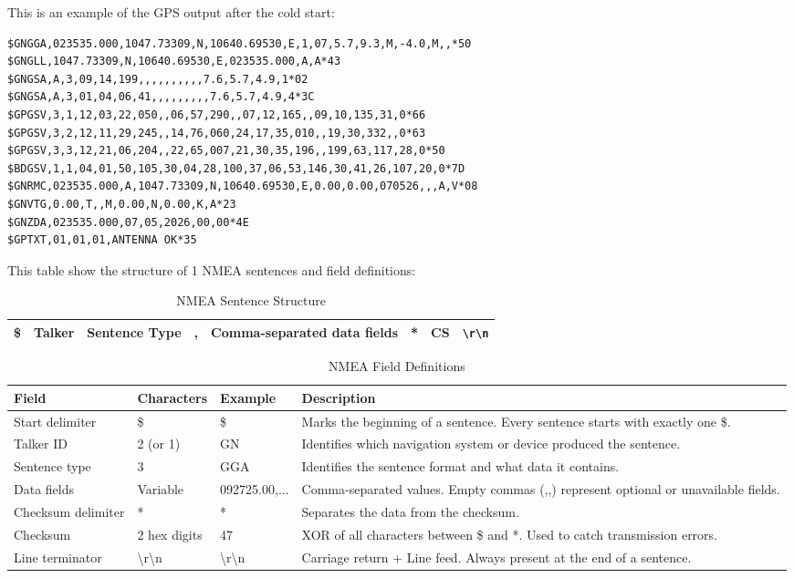 This is an example of the GPS output after the cold start: 

\begin{lstlisting}
$GNGGA,023535.000,1047.73309,N,10640.69530,E,1,07,5.7,9.3,M,-4.0,M,,*50
$GNGLL,1047.73309,N,10640.69530,E,023535.000,A,A*43
$GNGSA,A,3,09,14,199,,,,,,,,,,7.6,5.7,4.9,1*02
$GNGSA,A,3,01,04,06,41,,,,,,,,,7.6,5.7,4.9,4*3C
$GPGSV,3,1,12,03,22,050,,06,57,290,,07,12,165,,09,10,135,31,0*66
$GPGSV,3,2,12,11,29,245,,14,76,060,24,17,35,010,,19,30,332,,0*63
$GPGSV,3,3,12,21,06,204,,22,65,007,21,30,35,196,,199,63,117,28,0*50
$BDGSV,1,1,04,01,50,105,30,04,28,100,37,06,53,146,30,41,26,107,20,0*7D
$GNRMC,023535.000,A,1047.73309,N,10640.69530,E,0.00,0.00,070526,,,A,V*08
$GNVTG,0.00,T,,M,0.00,N,0.00,K,A*23
$GNZDA,023535.000,07,05,2026,00,00*4E
$GPTXT,01,01,01,ANTENNA OK*35
\end{lstlisting}

This table show the structure of 1 NMEA sentences and field definitions: 

\begin{table}[h]
\centering
\renewcommand{\arraystretch}{1.5}
\begin{tabular}{|c|c|c|c|c|c|c|c|}
\hline
\$ & Talker & Sentence Type & , & Comma-separated data fields & * & CS & \texttt{\textbackslash r\textbackslash n}\\ \hline
\end{tabular}
\caption{NMEA Sentence Structure}
\end{table}

\begin{table}[h]
\centering
\renewcommand{\arraystretch}{1.2}
\begin{tabular}{|l|l|l|p{6cm}|}
\hline
\textbf{Field} & \textbf{Characters} & \textbf{Example} & \textbf{Description} \\ \hline
Start delimiter & \$ & \$ & Marks the beginning of a sentence. Every sentence starts with exactly one \$. \\ \hline
Talker ID & 2 (or 1) & GN & Identifies which navigation system or device produced the sentence. \\ \hline
Sentence type & 3 & GGA & Identifies the sentence format and what data it contains. \\ \hline
Data fields & Variable & 092725.00,... & Comma-separated values. Empty commas (,,) represent optional or unavailable fields. \\ \hline
Checksum delimiter & * & * & Separates the data from the checksum. \\ \hline
Checksum & 2 hex digits & 47 & XOR of all characters between \$ and *. Used to catch transmission errors. \\ \hline
Line terminator & \textbackslash r\textbackslash n & \textbackslash r\textbackslash n & Carriage return + Line feed. Always present at the end of a sentence. \\ \hline
\end{tabular}
\caption{NMEA Field Definitions}
\end{table}


